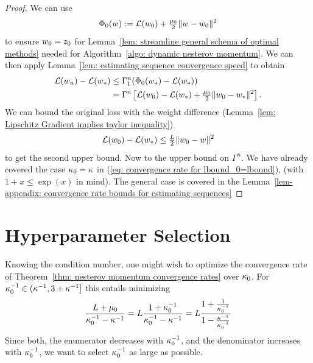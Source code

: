 \begin{proof}
	We can use
	\begin{align*}
		\Phi_0(w) := \mathcal{L}(w_0) + \tfrac{\mu_0}{2}\|w -w_0\|^2
	\end{align*}
	to ensure \(w_0=z_0\) for Lemma~\ref{lem: streamline general
	schema of optimal methods} needed for Algorithm~\ref{algo: dynamic nesterov
	momentum}. We can then apply Lemma~\ref{lem: estimating sequence
	convergence speed} to obtain
	\begin{align*}
		\mathcal{L}(w_n)-\mathcal{L}(w_*)
		&\le \Gamma_1^n(\Phi_0(w_*)-\mathcal{L}(w_*))\\
		&= \Gamma^n\left[
			\mathcal{L}(w_0) -\mathcal{L}(w_*)
			+ \tfrac{\mu_0}2\|w_0-w_*\|^2
		\right].
	\end{align*}	
	We can bound the original loss with the weight difference
	(Lemma~\ref{lem: Lipschitz Gradient implies taylor inequality})
	\begin{align*}
		\mathcal{L}(w_0)-\mathcal{L}(w_*)\le \tfrac{L}{2}\|w_0-w\|^2
	\end{align*}
	to get the second upper bound.
	Now to the upper bound on \(\Gamma^n\). We have already covered the case
	\(\kappa_0=\kappa\) in (\ref{eq: convergence rate for lbound_0=lbound}),
	(with \(1+x\le\exp(x)\) in mind). The general case is covered in the
	Lemma~\ref{lem-appendix: convergence rate bounds for estimating sequences}
\end{proof}

\section{Hyperparameter Selection}

Knowing the condition number, one might wish to optimize the convergence rate
of Theorem~\ref{thm: nesterov momentum convergence rates} over \(\kappa_0\).
For \(\kappa_0^{-1}\in(\kappa^{-1}, 3+\kappa^{-1}]\) this entails
minimizing
\begin{align}\label{eq: convergence rate optimization}
	\frac{L+\mu_0}{\kappa_0^{-1}-\kappa^{-1}}
	= L \frac{1+\kappa_0^{-1}}{\kappa_0^{-1}-\kappa^{-1}}
	= L \frac{1+\frac{1}{\kappa_0^{-1}}}{1-\frac{\kappa^{-1}}{\kappa_0^{-1}}}
\end{align}
Since both, the enumerator decreases with \(\kappa_0^{-1}\), and the
denominator increases with \(\kappa_0^{-1}\), we want to select
\(\kappa_0^{-1}\) as large as possible.

